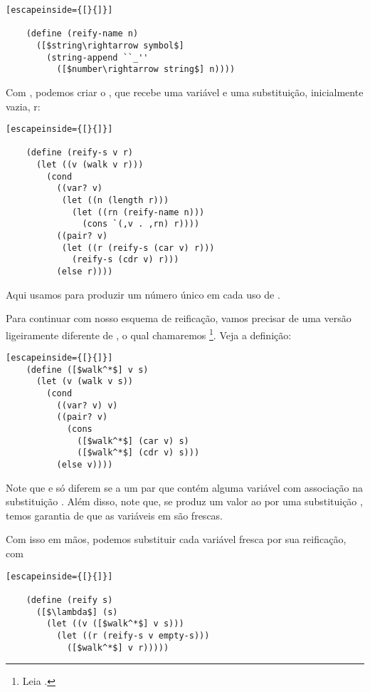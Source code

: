   \begin{lstlisting}[escapeinside={[}{]}]

    (define (reify-name n)
      ([$string\rightarrow symbol$]
        (string-append ``_''
          ([$number\rightarrow string$] n))))

  \end{lstlisting}

  Com , podemos criar o , que
  recebe uma variável e uma substituição, inicialmente vazia, r:

  \begin{lstlisting}[escapeinside={[}{]}]

    (define (reify-s v r)
      (let ((v (walk v r)))
        (cond
          ((var? v)
           (let ((n (length r)))
             (let ((rn (reify-name n)))
               (cons `(,v . ,rn) r))))
          ((pair? v)
           (let ((r (reify-s (car v) r)))
             (reify-s (cdr v) r)))
          (else r))))

  \end{lstlisting}

  \noindent Aqui usamos  para produzir um número
  único em cada uso de .

  Para continuar com nosso esquema de reificação, vamos precisar de
  uma versão ligeiramente diferente de , o qual
  chamaremos \footnote{Leia .}. Veja a definição:
  
  \begin{lstlisting}[escapeinside={[}{]}]
    (define ([$walk^*$] v s)
      (let (v (walk v s))
        (cond
          ((var? v) v)
          ((pair? v)
            (cons
              ([$walk^*$] (car v) s)
              ([$walk^*$] (cdr v) s)))
          (else v))))
  \end{lstlisting}

  Note que  e  só diferem se
    a um par que contém alguma
  variável com associação na substituição . Além disso,
  note que, se  produz um valor  ao
   por uma substituição , temos
  garantia de que as variáveis em  são frescas.

  Com isso em mãos, podemos substituir cada variável fresca por sua
  reificação, com

  \begin{lstlisting}[escapeinside={[}{]}]

    (define (reify s)
      ([$\lambda$] (s)
        (let ((v ([$walk^*$] v s)))
          (let ((r (reify-s v empty-s)))
            ([$walk^*$] v r)))))

  \end{lstlisting}

